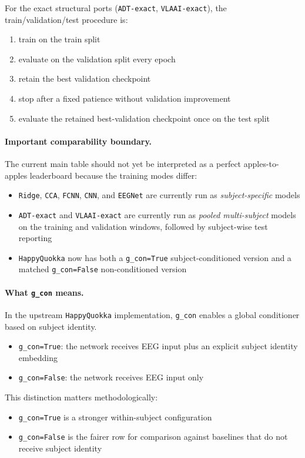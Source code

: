 \documentclass[11pt]{article}
\begin{document}
For the exact structural ports (\texttt{ADT-exact}, \texttt{VLAAI-exact}), the train/validation/test procedure is:
\begin{enumerate}
\item train on the train split
\item evaluate on the validation split every epoch
\item retain the best validation checkpoint
\item stop after a fixed patience without validation improvement
\item evaluate the retained best-validation checkpoint once on the test split
\end{enumerate}

\paragraph{Important comparability boundary.}
The current main table should not yet be interpreted as a perfect apples-to-apples leaderboard because the training modes differ:
\begin{itemize}
\item \texttt{Ridge}, \texttt{CCA}, \texttt{FCNN}, \texttt{CNN}, and \texttt{EEGNet} are currently run as \emph{subject-specific} models
\item \texttt{ADT-exact} and \texttt{VLAAI-exact} are currently run as \emph{pooled multi-subject} models on the training and validation windows, followed by subject-wise test reporting
\item \texttt{HappyQuokka} now has both a \texttt{g\_con=True} subject-conditioned version and a matched \texttt{g\_con=False} non-conditioned version
\end{itemize}

\paragraph{What \texttt{g\_con} means.}
In the upstream \texttt{HappyQuokka} implementation, \texttt{g\_con} enables a global conditioner based on subject identity.
\begin{itemize}
\item \texttt{g\_con=True}: the network receives EEG input plus an explicit subject identity embedding
\item \texttt{g\_con=False}: the network receives EEG input only
\end{itemize}
This distinction matters methodologically:
\begin{itemize}
\item \texttt{g\_con=True} is a stronger within-subject configuration
\item \texttt{g\_con=False} is the fairer row for comparison against baselines that do not receive subject identity
\end{itemize}
\end{document}
